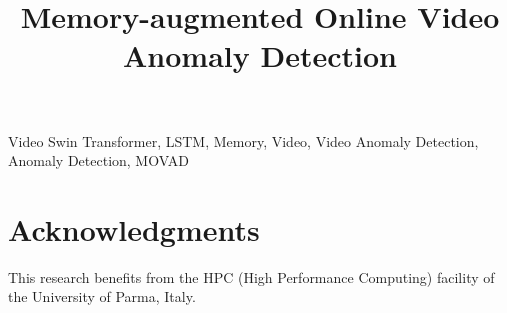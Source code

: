 \documentclass{article}
\title{Memory-augmented Online Video Anomaly Detection}
\begin{document}
%
\maketitle
%

\begin{abstract}
    
\end{abstract}
\begin{keywords}
    Video Swin Transformer, LSTM, Memory, Video, Video Anomaly Detection, Anomaly Detection, MOVAD
\end{keywords}


%
%




\section*{Acknowledgments}
\noindent This research benefits from the HPC (High Performance Computing) facility of the University of Parma, Italy.





%
\end{document}
